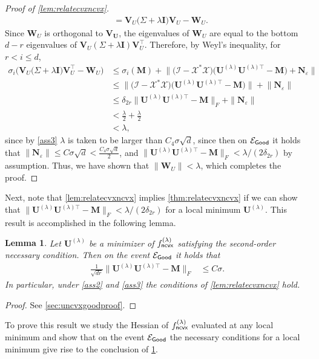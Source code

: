 \documentclass[10pt]{article}
\newcommand{\eps}{\ensuremath{\varepsilon}}
\newcommand{\s}{^*}
\renewcommand{\t}{^{\top}}
\newtheorem{lemma}{Lemma}
\theoremstyle{definition}
\begin{document}
\begin{proof}[Proof of \cref{lem:relatecvxncvx}]
\begin{align}
    &= \bm{V}_{U} \bigg( \Sigma + \lambda \bm{I} \bigg) \bm{V}_U - \bm{W}_U.  
\end{align}
Since $\bm{W}_U$ is orthogonal to $\bm{V}_{\bm{U}}$, the eigenvalues of $\bm{W}_U$ are equal to the bottom $d - r$ eigenvalues of $\bm{V}_U(\Sigma + \lambda \bm{I}) \bm{V}_U\t$. 
Therefore, by Weyl's inequality, for $r < i \leq d$,
\begin{align}
    \sigma_i \bigg( \bm{V}_{U} \bigg( \Sigma + \lambda \bm{I} \bigg) \bm{V}_U\t - \bm{W}_U \bigg) &\leq \sigma_i(\bm{M}) + \bigg\| \bigg( \mathcal{I} - \mathcal{X}\s \mathcal{X}  \bigg) \big( \bm{U}^{(\lambda)}\bm{U}^{(\lambda)\top} - \bm{M}  \big) + \bm{N}_{\eps} \bigg\| \\
    &\leq \bigg\|  \bigg( \mathcal{I} - \mathcal{X}\s \mathcal{X}  \bigg) \big( \bm{U}^{(\lambda)}\bm{U}^{(\lambda)\top} - \bm{M}  \big) \bigg\| + \bigg\| \bm{N}_{\eps} \bigg\| \\
    &\leq  \delta_{2r} \| \bm{U}^{(\lambda)}\bm{U}^{(\lambda)\top} - \bm{M} \|_F + \| \bm{N}_{\eps} \| \\
    &< \frac{\lambda}{2} + \frac{\lambda}{2} \\
    &< \lambda,
\end{align}
since by \cref{ass3} $\lambda$ is taken to be  larger than $C_4 \sigma \sqrt{d}$, since then on $\mathcal{E}_{{\sf Good}}$ it holds that $\|\bm{N}_{\eps}\| \leq C\sigma \sqrt{d} < \frac{C_4 \sigma \sqrt{d}}{2}$, and  $ \| \bm{U}^{(\lambda)}\bm{U}^{(\lambda)\top} - \bm{M} \|_F < \lambda/(2\delta_{2r})$ by  assumption.  Thus, we have shown that $\| \bm{W}_U\| < \lambda$, which completes the proof.
\end{proof}



Next, note that \cref{lem:relatecvxncvx} implies \cref{thm:relatecvxncvx} if we can show that $ \| \bm{U}^{(\lambda)}\bm{U}^{(\lambda)\top} - \bm{M} \|_F < \lambda/(2\delta_{2r})$ for a local minimum $\bm{U}^{(\lambda)}$.  This result is accomplished in the following lemma.   
\begin{lemma} \label{lem:uncvxgood}
Let $\bm{U}^{(\lambda)}$ be a minimizer of $f^{(\lambda)}_{{\sf ncvx}}$ satisfying the second-order necessary condition.  Then on the event $\mathcal{E}_{{\sf Good}}$ it holds that
\begin{align}
    \frac{1}{\sqrt{dr}}\| \bm{U}^{(\lambda)} \bm{U}^{(\lambda)\top} - \bm{M} \|_F &\leq C \sigma. 
\end{align}
In particular, under \cref{ass2} and \cref{ass3} the conditions of \cref{lem:relatecvxncvx} hold.
\end{lemma}
\begin{proof}
   See \cref{sec:uncvxgoodproof}.
\end{proof}
To prove this result we study the Hessian of $f^{(\lambda)}_{{\sf ncvx}}$ evaluated at any local minimum and show that on the event $\mathcal{E}_{{\sf Good}}$ the necessary conditions for a local minimum give rise to the conclusion of \cref{lem:uncvxgood}.  
\end{document}
